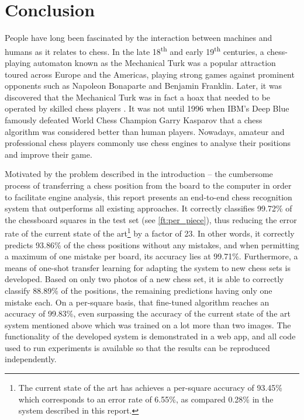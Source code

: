 \documentclass[../report.tex]{subfiles}
\begin{document}
\chapter{Conclusion}
\label{chap:conclusion}

People have long been fascinated by the interaction between machines and humans as it relates to chess.
In the late 18\textsuperscript{th} and early 19\textsuperscript{th} centuries, a chess-playing automaton known as the Mechanical Turk was a popular attraction toured across Europe and the Americas, playing strong games against prominent opponents such as Napoleon Bonaparte and Benjamin Franklin.
Later, it was discovered that the Mechanical Turk was in fact a hoax that needed to be operated by skilled chess players \cite{standage2003}.
It was not until 1996 when IBM's Deep Blue famously defeated World Chess Champion Garry Kasparov that a chess algorithm was considered better than human players.
Nowadays, amateur and professional chess players commonly use chess engines to analyse their positions and improve their game.

Motivated by the problem described in the introduction -- the cumbersome process of transferring a chess position from the board to the computer in order to facilitate engine analysis, this report presents an end-to-end chess recognition system that outperforms all existing approaches.
It correctly classifies 99.72\% of the chessboard squares in the test set (see \cref{ft:per_piece}), thus reducing the error rate of the current state of the art\footnote{The current state of the art has achieves a per-square accuracy of 93.45\% \cite{mehta2020} which corresponds to an error rate of 6.55\%, as compared 0.28\% in the system described in this report.} by a factor of 23.
In other words, it correctly predicts 93.86\% of the chess positions without any mistakes, and when permitting a maximum of one mistake per board, its accuracy lies at 99.71\%.
Furthermore, a means of one-shot transfer learning for adapting the system to new chess sets is developed.
Based on only two photos of a new chess set, it is able to correctly classify 88.89\% of the positions, the remaining predictions having only one mistake each.
On a per-square basis, that fine-tuned algorithm reaches an accuracy of 99.83\%, even surpassing the accuracy of the current state of the art system mentioned above which was trained on a lot more than two images.
The functionality of the developed system is demonstrated in a web app, and all code used to run experiments is available so that the results can be reproduced independently.
\end{document}

